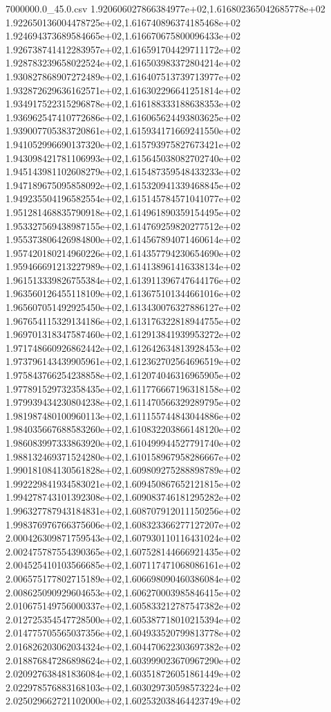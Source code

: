 \begin{filecontents*}{7000000.0_45.0.csv}
1.920606027866384977e+02,1.616802365042685778e+02
1.922650136004478725e+02,1.616740896374185468e+02
1.924694373689584665e+02,1.616670675800096433e+02
1.926738741412283957e+02,1.616591704429711172e+02
1.928783239658022524e+02,1.616503983372804214e+02
1.930827868907272489e+02,1.616407513739713977e+02
1.932872629636162571e+02,1.616302296641251814e+02
1.934917522315296878e+02,1.616188333188638353e+02
1.936962547410772686e+02,1.616065624493803625e+02
1.939007705383720861e+02,1.615934171669241550e+02
1.941052996690137320e+02,1.615793975827673421e+02
1.943098421781106993e+02,1.615645038082702740e+02
1.945143981102608279e+02,1.615487359548433233e+02
1.947189675095858092e+02,1.615320941339468845e+02
1.949235504196582554e+02,1.615145784571041077e+02
1.951281468835790918e+02,1.614961890359154495e+02
1.953327569438987155e+02,1.614769259820277512e+02
1.955373806426984800e+02,1.614567894071460614e+02
1.957420180214960226e+02,1.614357794230654690e+02
1.959466691213227989e+02,1.614138961416338134e+02
1.961513339826755384e+02,1.613911396747644176e+02
1.963560126455118109e+02,1.613675101344661016e+02
1.965607051492925450e+02,1.613430076327886127e+02
1.967654115329134186e+02,1.613176322818944755e+02
1.969701318347587460e+02,1.612913841939953272e+02
1.971748660926862442e+02,1.612642634813928453e+02
1.973796143439905961e+02,1.612362702564696519e+02
1.975843766254238858e+02,1.612074046316965905e+02
1.977891529732358435e+02,1.611776667196318158e+02
1.979939434230804238e+02,1.611470566329289795e+02
1.981987480100960113e+02,1.611155744843044886e+02
1.984035667688583260e+02,1.610832203866148120e+02
1.986083997333863920e+02,1.610499944527791740e+02
1.988132469371524280e+02,1.610158967958286667e+02
1.990181084130561828e+02,1.609809275288898789e+02
1.992229841934583021e+02,1.609450867652121815e+02
1.994278743101392308e+02,1.609083746181295282e+02
1.996327787943184831e+02,1.608707912011150256e+02
1.998376976766375606e+02,1.608323366277127207e+02
2.000426309871759543e+02,1.607930110116431024e+02
2.002475787554390365e+02,1.607528144666921435e+02
2.004525410103566685e+02,1.607117471068086161e+02
2.006575177802715189e+02,1.606698090460386084e+02
2.008625090929604653e+02,1.606270003985846415e+02
2.010675149756000337e+02,1.605833212787547382e+02
2.012725354547728500e+02,1.605387718010215394e+02
2.014775705565037356e+02,1.604933520799813778e+02
2.016826203062034324e+02,1.604470622303697382e+02
2.018876847286898624e+02,1.603999023670967290e+02
2.020927638481836084e+02,1.603518726051861449e+02
2.022978576883168103e+02,1.603029730598573224e+02
2.025029662721102000e+02,1.602532038464423749e+02

\end{filecontents*}
